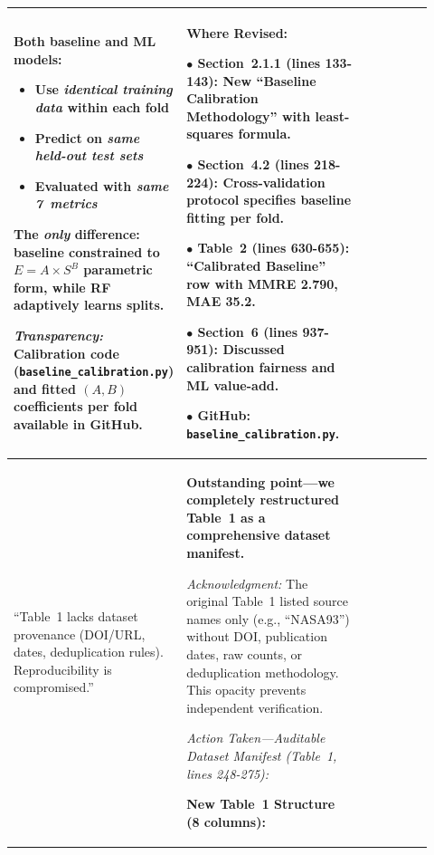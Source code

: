 \documentclass[11pt,a4paper]{article}
\begin{document}
\begin{longtable}{>{\raggedright\arraybackslash}p{0.26\linewidth}|>{\raggedright\arraybackslash}p{0.44\linewidth}|>{\raggedright\arraybackslash}p{0.22\linewidth}}
Both baseline and ML models:
\begin{itemize}
    \item Use \textit{identical training data} within each fold
    \item Predict on \textit{same held-out test sets}
    \item Evaluated with \textit{same 7~metrics}
\end{itemize}

The \textit{only} difference: baseline constrained to $E=A \times S^B$ parametric form, while RF adaptively learns splits.

\textit{Transparency:} Calibration code (\texttt{baseline\_calibration.py}) and fitted $(A, B)$ coefficients per fold available in GitHub. &

\textbf{Where Revised:}

$\bullet$ \textbf{Section~2.1.1} (lines 133-143): New ``Baseline Calibration Methodology'' with least-squares formula.

$\bullet$ \textbf{Section~4.2} (lines 218-224): Cross-validation protocol specifies baseline fitting per fold.

$\bullet$ \textbf{Table~2} (lines 630-655): ``Calibrated Baseline'' row with MMRE 2.790, MAE 35.2.

$\bullet$ \textbf{Section~6} (lines 937-951): Discussed calibration fairness and ML value-add.

$\bullet$ \textbf{GitHub}: \texttt{baseline\_calibration.py}. \\

\midrule

``Table~1 lacks dataset provenance (DOI/URL, dates, deduplication rules). Reproducibility is compromised.'' &

\textbf{Outstanding point---we completely restructured Table~1 as a comprehensive dataset manifest.}

\textit{Acknowledgment:} The original Table~1 listed source names only (e.g., ``NASA93'') without DOI, publication dates, raw counts, or deduplication methodology. This opacity prevents independent verification.

\textit{Action Taken---Auditable Dataset Manifest (Table~1, lines 248-275):}

\textbf{New Table~1 Structure (8 columns):}


\end{longtable}
\end{document}
